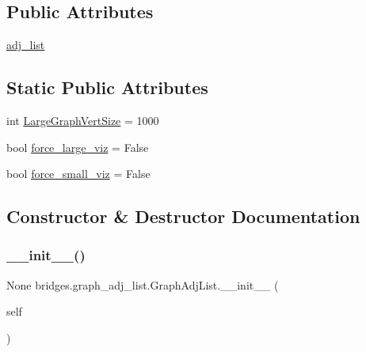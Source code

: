 \subsection*{Public Attributes}
\begin{DoxyCompactItemize}
\item 
\mbox{\hyperlink{classbridges_1_1graph__adj__list_1_1_graph_adj_list_ad39dbb3db39a3ffc145c372e6996443c}{adj\+\_\+list}}
\end{DoxyCompactItemize}
\subsection*{Static Public Attributes}
\begin{DoxyCompactItemize}
\item 
int \mbox{\hyperlink{classbridges_1_1graph__adj__list_1_1_graph_adj_list_a093a64ead793e0bd3b1ce4e3456665c9}{Large\+Graph\+Vert\+Size}} = 1000
\item 
bool \mbox{\hyperlink{classbridges_1_1graph__adj__list_1_1_graph_adj_list_aa9f4209af428473fd2d6952a74eb22b9}{force\+\_\+large\+\_\+viz}} = False
\item 
bool \mbox{\hyperlink{classbridges_1_1graph__adj__list_1_1_graph_adj_list_a27900e6bb5504036ccf5ec2e4d301ddb}{force\+\_\+small\+\_\+viz}} = False
\end{DoxyCompactItemize}


\subsection{Constructor \& Destructor Documentation}
\mbox{\label{classbridges_1_1graph__adj__list_1_1_graph_adj_list_ace583fede9dccbdc0360da581c7a6194}} 
\subsubsection{\texorpdfstring{\_\_init\_\_()}{\_\_init\_\_()}}
{\footnotesize\ttfamily  None bridges.\+graph\+\_\+adj\+\_\+list.\+Graph\+Adj\+List.\+\_\+\+\_\+init\+\_\+\+\_\+ (\begin{DoxyParamCaption}\item[{}]{self }\end{DoxyParamCaption})}



